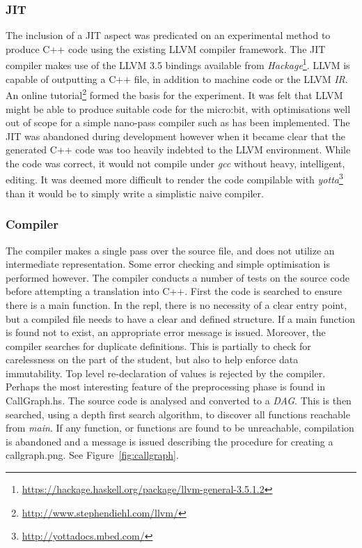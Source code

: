 \documentclass[12pt, a4paper]{report}
\begin{document}
\subsubsection{JIT}\label{JIT}
The inclusion of a JIT aspect was predicated on an experimental method to produce C++ code using
the existing LLVM compiler framework. The JIT compiler makes use of the LLVM 3.5 bindings available
from \textit{Hackage}\footnote{\url{https://hackage.haskell.org/package/llvm-general-3.5.1.2}}.
LLVM is capable of outputting a C++ file, in addition to machine code or the LLVM \textit{IR}.
An online tutorial\footnote{\url{http://www.stephendiehl.com/llvm/}} formed the basis for the
experiment. It was felt that LLVM might be able to produce suitable code for the micro:bit, with
optimisations well out of scope for a simple nano-pass compiler such as has been implemented. The
JIT was abandoned during development however when it became clear that the generated C++ code was
too heavily indebted to the LLVM environment. While the code was correct, it would not compile under
\textit{gcc} without heavy, intelligent, editing. It was deemed more difficult to render the code compilable
with \textit{yotta}\footnote{\url{http://yottadocs.mbed.com/}} than it would be to simply write a
simplistic naive compiler.

\subsubsection{Compiler}
The compiler makes a single pass over the source file, and does not utilize an intermediate
representation. Some error checking and simple optimisation is performed however. The compiler
conducts a number of tests on the source code before attempting a translation into C++. First the
code is searched to ensure there is a main function. In the repl, there is no necessity of a clear
entry point, but a compiled file needs to have a clear and defined structure. If a main function is
found not to exist, an appropriate error message is issued. Moreover, the compiler searches for
duplicate definitions. This is partially to check for carelessness on the part of the student, but
also to help enforce data immutability. Top level re-declaration of values is rejected by the
compiler. Perhaps the most interesting feature of the preprocessing phase is found in CallGraph.hs.
The source code is analysed and converted to a \textit{\gls{DAG}}. This is then
searched, using a depth first search algorithm, to discover all functions reachable from
\textit{main}. If any function, or functions are found to be unreachable, compilation is abandoned
and a message is issued describing the procedure for creating a callgraph.png. See
Figure~\ref{fig:callgraph}.
\end{document}

